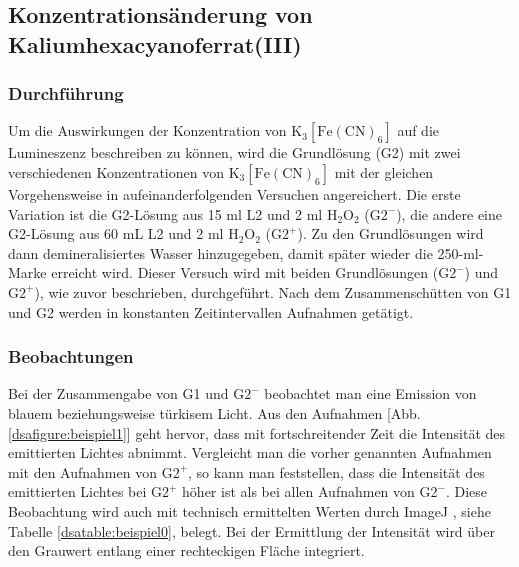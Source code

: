\subsection{Konzentrationsänderung von Kaliumhexacyanoferrat(III)}

\subsubsection{Durchführung}

Um die Auswirkungen der Konzentration von $\mathrm{K}_3[\mathrm{Fe}(\mathrm{CN})_6]$ auf die Lumineszenz beschreiben zu können, wird die Grundlösung (G2) mit zwei verschiedenen Konzentrationen von $\mathrm{K}_3[\mathrm{Fe}(\mathrm{CN})_6]$ mit der gleichen Vorgehensweise in aufeinanderfolgenden Versuchen angereichert. Die erste Variation ist die G2-Lösung aus 15 ml L2 und 2 ml $\mathrm{H}_2\mathrm{O}_2$ ($\mathrm{G}2^-$), die andere eine G2-Lösung aus 60 mL L2 und 2 ml $\mathrm{H}_2\mathrm{O}_2$ ($\mathrm{G}2^+$). Zu den Grundlösungen wird dann demineralisiertes Wasser hinzugegeben, damit später wieder die 250-ml-Marke erreicht wird.
Dieser Versuch wird mit beiden Grundlösungen ($\mathrm{G}2^-$) und $\mathrm{G}2^+$), wie zuvor beschrieben, durchgeführt. Nach dem Zusammenschütten von G1 und G2 werden in konstanten Zeitintervallen Aufnahmen getätigt.
 
\subsubsection{Beobachtungen}

Bei der Zusammengabe von G1 und $\mathrm{G}2^-$ beobachtet man eine Emission von blauem beziehungsweise türkisem Licht.
Aus den Aufnahmen [Abb. \ref{dsafigure:beispiel1}] geht hervor, dass mit fortschreitender Zeit die Intensität des emittierten Lichtes abnimmt. Vergleicht man die vorher genannten Aufnahmen mit den Aufnahmen von $\mathrm{G}2^+$, so kann man feststellen, dass die Intensität des emittierten Lichtes bei $\mathrm{G}2^+$ höher ist als bei allen Aufnahmen von $\mathrm{G}2^-$. Diese Beobachtung wird auch mit technisch ermittelten  Werten durch ImageJ \cite{ImageJ}, siehe Tabelle \ref{dsatable:beispiel0}, belegt. Bei der Ermittlung der Intensität wird über den Grauwert entlang einer rechteckigen Fläche integriert.  

